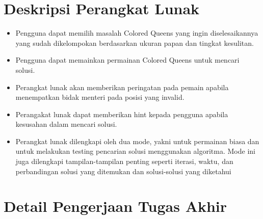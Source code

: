 \documentclass[a4paper,twoside]{article}
\begin{document}
	\section{Deskripsi Perangkat Lunak}
		\begin{itemize}
		\item Pengguna dapat memilih masalah Colored Queens yang ingin diselesaikannya yang sudah dikelompokan berdasarkan ukuran papan dan tingkat kesulitan.
		
		\item Pengguna dapat memainkan permainan Colored Queens untuk mencari solusi.
		
		\item Perangkat lunak akan memberikan peringatan pada pemain apabila menempatkan bidak menteri pada posisi yang invalid.
		
		\item Perangakat lunak dapat memberikan hint kepada pengguna apabila kesusahan dalam mencari solusi.
		
		\item Perangkat lunak dilengkapi oleh dua mode, yakni untuk permainan biasa dan untuk melakukan testing pencarian solusi menggunakan algoritma. Mode ini juga dilengkapi tampilan-tampilan penting seperti iterasi, waktu, dan perbandingan solusi yang ditemukan dan solusi-solusi yang diketahui
	\end{itemize}
	
	\section{Detail Pengerjaan Tugas Akhir}
\end{document}
